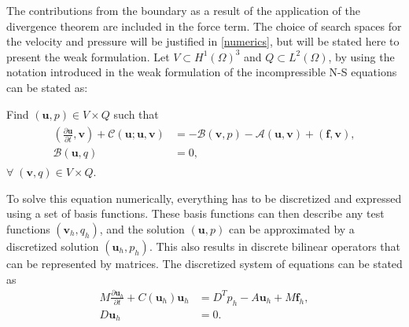 %
The contributions from the boundary as a result of the application of the divergence theorem are included in the 
force term.
The choice of search spaces for the velocity and pressure will be justified in \cref{numerics}, but will 
be stated here to present the weak formulation. Let $V \subset H^1(\Omega)^3$ and $Q \subset L^2(\Omega)$,
by using the notation introduced in  the weak formulation of the incompressible
N-S equations can be stated as: 

Find $(\mathbf{u}, p) \in V\times Q$ such that 
\begin{align}
    \begin{split}
        (\frac{\partial \mathbf{u}}{\partial t},\mathbf{v})
        + \mathcal{C}(\mathbf{u};\mathbf{u},\mathbf{v})
        &= -\mathcal{B}(\mathbf{v},p) 
        -\mathcal{A}(\mathbf{u},\mathbf{v})
        + (\mathbf{f},\mathbf{v}), \\
        \mathcal{B}(\mathbf{u},q) &= 0,
    \end{split}
	\label{eq:NSweak}
\end{align}
$\forall\; (\mathbf{v}, q) \in V\times Q$.
%

To solve this equation numerically, everything has to be discretized and expressed 
using a set of basis functions. These basis functions can then describe any test functions
$(\mathbf{v}_h,q_h)$, and the solution $(\mathbf{u},p)$ can be approximated by a discretized 
solution $(\mathbf{u}_h,p_h)$. This also results in discrete bilinear operators that can be
represented by matrices. The discretized system of equations can be stated as
%
\begin{align}
    M\frac{\partial \mathbf{u}_h}{\partial t} +C(\mathbf{u}_h)\mathbf{u}_h 
    &= D^Tp_h-A\mathbf{u}_h +M\mathbf{f}_h,\\
    D\mathbf{u}_h &= 0.
    \label{eq:NSMatrixform}
\end{align}
%

